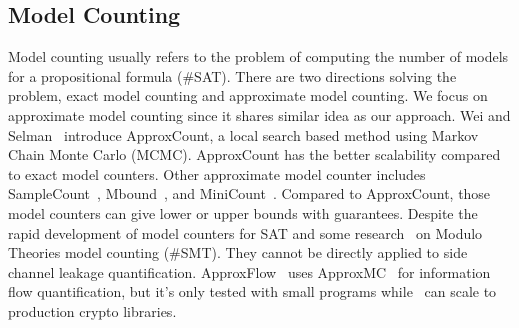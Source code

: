 \subsection{Model Counting}
Model counting usually refers to the problem of computing the number of 
models for a propositional formula (\#SAT). There are two directions
solving the problem, exact model counting and approximate model 
counting. We focus on approximate model counting since it shares similar 
idea as our approach. Wei and Selman~\cite{wei2005new} introduce
ApproxCount, a local search based method using Markov Chain Monte 
Carlo (MCMC). ApproxCount has the better scalability compared to 
exact model counters. Other approximate model counter includes 
SampleCount~\cite{gomes2007sampling},
Mbound~\cite{gomes2006model}, and MiniCount~\cite{kroc2008leveraging}. 
Compared to ApproxCount,
those model counters can give lower or upper bounds with guarantees.
Despite the rapid development of model counters for SAT and some 
research~\cite{chistikov2017approximate,phan2015model} on Modulo Theories model counting (\#SMT).
They cannot be directly applied to 
side channel leakage quantification.
ApproxFlow~\cite{biondi2018scalable} uses ApproxMC~\cite{chakraborty2016algorithmic} for information flow quantification,
but it's only tested with small programs while \tool\ can scale to production crypto libraries. 



